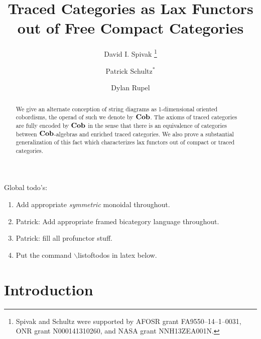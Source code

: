 \documentclass[12pt,oneside,article,draft]{memoir}
\title{Traced Categories as Lax Functors out of Free Compact Categories}
\author{
   David I. Spivak
      \thanks{Spivak and Schultz were supported by AFOSR grant FA9550--14--1--0031, ONR grant N000141310260, and NASA grant NNH13ZEA001N.}
   \and Patrick Schultz${}^*$%
   \and Dylan Rupel
}
\begin{document}
\tightlists
\firmlists

\maketitle
\begin{abstract}
   We give an alternate conception of string diagrams as 1-dimensional oriented cobordisms, the
   operad of such we denote by $\mathbf{Cob}$.  The axioms of traced categories are fully encoded by $\mathbf{Cob}$
   in the sense that there is an equivalence of categories between $\mathbf{Cob}$-algebras and enriched
   traced categories.  We also prove a substantial generalization of this fact which characterizes
   lax functors out of compact or traced categories.
\end{abstract}
Global todo's:
\begin{enumerate}
   \item Add appropriate {\em symmetric\/} monoidal throughout.
   \item Patrick: Add appropriate framed bicategory language throughout.
   \item Patrick: fill all profunctor stuff.
   \item Put the command $\backslash${listoftodos} in latex below.
\end{enumerate}


\setcounter{tocdepth}{1}
\tableofcontents*

\chapter{Introduction}
\end{document}
